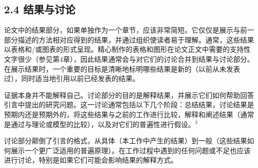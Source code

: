 \subsection*{2.4 结果与讨论}
论文中的结果部分，如果单独作为一个章节，应该非常简短。它仅仅是展示与前一部分描述的方法相对应得到的结果，并通过组织使读者易于理解。通常，这些结果以表格和/或图表的形式呈现。精心制作的表格和图形在论文正文中需要的支持性文字很少（参见第4章），因此结果通常会与对它们的讨论合并到结果与讨论部分。在展示结果时，一个重要的目标是清晰地标明哪些结果是新的（以前从未发表过），同时适当地引用以前已经发表的结果。

证据本身并不能解释自己。讨论部分的目的是解释结果，并展示它们如何帮助回答引言中提出的研究问题。这一讨论通常包括以下几个阶段：总结结果，讨论结果是预期内还是预期外的，将这些结果与之前的工作进行比较，解释和阐述结果（通常是通过与理论或模型的比较），以及对它们的普遍性进行假设。${ }^{3}$

讨论部分颠倒了引言的格式，从具体（本工作中产生的结果）到一般（这些结果如何展示一个更广泛适用的普遍原理）。在工作过程中遇到的任何问题或不足也应该进行讨论，特别是如果它们可能会影响结果的解释方式。

